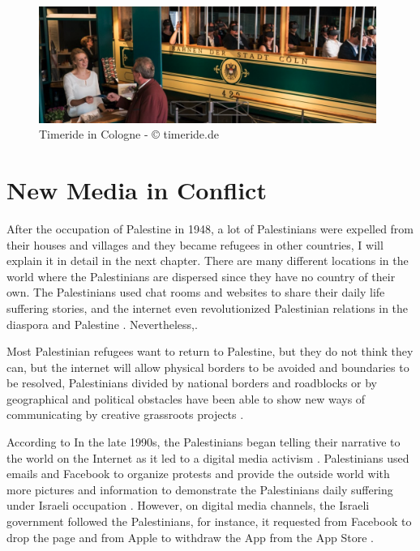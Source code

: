 \begin{figure}[ht]
    \centering
    \includegraphics[width=0.98\textwidth]{images/timeride.png}
    \caption{Timeride in Cologne - © timeride.de }
    \label{fig:time}
\end{figure}


\section{New Media in Conflict}

After the occupation of Palestine in 1948, a lot of Palestinians were expelled from their houses and villages and they became refugees in other countries, I will explain it in detail in the next chapter.  
There are many different locations in the world where the Palestinians are dispersed since they have no country of their own. The Palestinians used chat rooms and websites to share their daily life suffering stories, and the internet even revolutionized Palestinian relations in the diaspora and Palestine \citep{Ogunyemi2015, Aouragh2011}. Nevertheless,\cite [p.1]{Aouragh2011}.

Most Palestinian refugees want to return to Palestine, but they do not think they can, but the internet will allow physical borders to be avoided and boundaries to be resolved, Palestinians divided by national borders and roadblocks or by geographical and political obstacles have been able to show new ways of communicating by creative grassroots projects \citep{Aouragh2011}. 

According to \cite{Wulf2013} In the late 1990s, the Palestinians began telling their narrative to the world on the Internet as it led to a digital media activism \citep{Wulf2013}. Palestinians used emails and Facebook to organize protests and provide the outside world with more pictures and information to demonstrate the Palestinians daily suffering under Israeli occupation \citep{Wulf2013}. However, on digital media channels, the Israeli government followed the Palestinians, for instance, it requested from Facebook to drop the page  and from Apple to withdraw the  App from the App Store \citep{Wulf2013}. 

